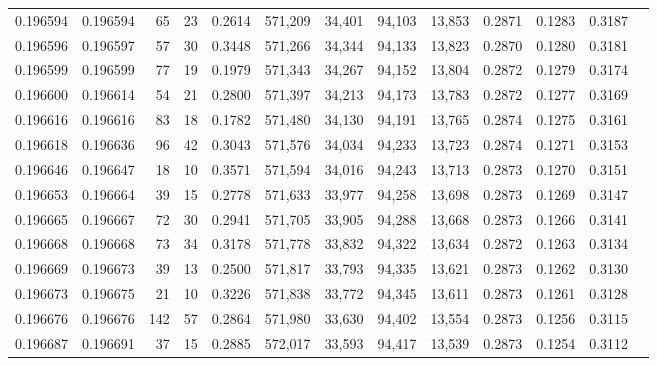 \begin{tabular}{rrrrrrrrrrrrr}
0.196594 & 0.196594 &    65 &  23 &                                     0.2614 & 571,209 &  34,401 &  94,103 &  13,853 & 0.2871 & 0.1283 & 0.3187 \\
0.196596 & 0.196597 &    57 &  30 &                                     0.3448 & 571,266 &  34,344 &  94,133 &  13,823 & 0.2870 & 0.1280 & 0.3181 \\
0.196599 & 0.196599 &    77 &  19 &                                     0.1979 & 571,343 &  34,267 &  94,152 &  13,804 & 0.2872 & 0.1279 & 0.3174 \\
0.196600 & 0.196614 &    54 &  21 &                                     0.2800 & 571,397 &  34,213 &  94,173 &  13,783 & 0.2872 & 0.1277 & 0.3169 \\
0.196616 & 0.196616 &    83 &  18 &                                     0.1782 & 571,480 &  34,130 &  94,191 &  13,765 & 0.2874 & 0.1275 & 0.3161 \\
0.196618 & 0.196636 &    96 &  42 &                                     0.3043 & 571,576 &  34,034 &  94,233 &  13,723 & 0.2874 & 0.1271 & 0.3153 \\
0.196646 & 0.196647 &    18 &  10 &                                     0.3571 & 571,594 &  34,016 &  94,243 &  13,713 & 0.2873 & 0.1270 & 0.3151 \\
0.196653 & 0.196664 &    39 &  15 &                                     0.2778 & 571,633 &  33,977 &  94,258 &  13,698 & 0.2873 & 0.1269 & 0.3147 \\
0.196665 & 0.196667 &    72 &  30 &                                     0.2941 & 571,705 &  33,905 &  94,288 &  13,668 & 0.2873 & 0.1266 & 0.3141 \\
0.196668 & 0.196668 &    73 &  34 &                                     0.3178 & 571,778 &  33,832 &  94,322 &  13,634 & 0.2872 & 0.1263 & 0.3134 \\
0.196669 & 0.196673 &    39 &  13 &                                     0.2500 & 571,817 &  33,793 &  94,335 &  13,621 & 0.2873 & 0.1262 & 0.3130 \\
0.196673 & 0.196675 &    21 &  10 &                                     0.3226 & 571,838 &  33,772 &  94,345 &  13,611 & 0.2873 & 0.1261 & 0.3128 \\
0.196676 & 0.196676 &   142 &  57 &                                     0.2864 & 571,980 &  33,630 &  94,402 &  13,554 & 0.2873 & 0.1256 & 0.3115 \\
0.196687 & 0.196691 &    37 &  15 &                                     0.2885 & 572,017 &  33,593 &  94,417 &  13,539 & 0.2873 & 0.1254 & 0.3112 \\

\end{tabular}
